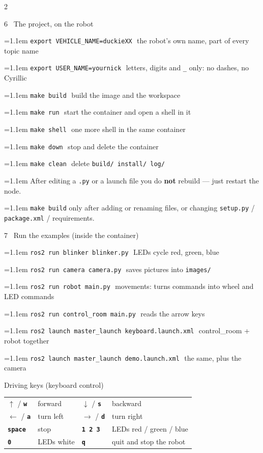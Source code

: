\documentclass[10pt,a4paper]{extarticle}
\newcommand{\code}[1]{\textcolor{accentd}{\texttt{#1}}}
\newcommand{\key}[1]{\textcolor{robotc}{\texttt{\textbf{#1}}}}
\newcommand{\ce}[2]{\par\hangindent=1.1em\hangafter=1
  \code{#1}\,\textcolor{dim}{\small\textemdash\ #2}\par\vspace{0.5pt}}
\newcommand{\nt}[1]{\par\hangindent=1.1em\hangafter=1
  \textcolor{dim}{\small #1}\par\vspace{0.5pt}}
\begin{document}
\begin{multicols}{2}
\begin{sect}{6 \ The project, on the robot}
\ce{export VEHICLE\_NAME=duckieXX}{the robot's own name, part of every topic name}
\ce{export USER\_NAME=yournick}{letters, digits and \code{\_} only: no dashes, no Cyrillic}
\vspace{2pt}
\ce{make build}{build the image and the workspace}
\ce{make run}{start the container and open a shell in it}
\ce{make shell}{one more shell in the same container}
\ce{make down}{stop and delete the container}
\ce{make clean}{delete \code{build/ install/ log/}}
\nt{After editing a \code{.py} or a launch file you do \textbf{not} rebuild --- just restart the node.}
\nt{\code{make build} only after adding or renaming files, or changing \code{setup.py} / \code{package.xml} / requirements.}
\end{sect}

\begin{sect}{7 \ Run the examples (inside the container)}
\ce{ros2 run blinker blinker.py}{LEDs cycle red, green, blue}
\ce{ros2 run camera camera.py}{saves pictures into \code{images/}}
\ce{ros2 run robot main.py}{movements: turns commands into wheel and LED commands}
\ce{ros2 run control\_room main.py}{reads the arrow keys}
\ce{ros2 launch master\_launch keyboard.launch.xml}{control\_room + robot together}
\ce{ros2 launch master\_launch demo.launch.xml}{the same, plus the camera}
\end{sect}

\begin{sect}{Driving keys (keyboard control)}
{
\begin{tabularx}{\linewidth}{@{}l@{\ }>{\raggedright\arraybackslash}X@{\ }l@{\ }>{\raggedright\arraybackslash}X@{}}
\key{$\uparrow$} / \key{w} & forward  & \key{$\downarrow$} / \key{s} & backward \\
\key{$\leftarrow$} / \key{a} & turn left & \key{$\rightarrow$} / \key{d} & turn right \\
\key{space} & stop & \key{1 2 3} & LEDs red / green / blue \\
\key{0} & LEDs white & \key{q} & quit and stop the robot \\
\end{tabularx}}
\end{sect}


\end{multicols}
\end{document}
